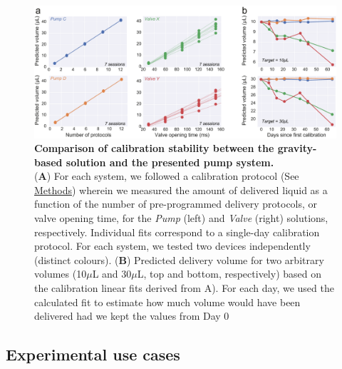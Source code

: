 \begin{figure} 
	\centering
	\includegraphics[width=1.0\linewidth]{Figures/Artboard 2.pdf}
	\caption{\textbf{Comparison of calibration stability between the gravity-based solution and the presented pump system.}\\
		(\textbf{A}) For each system, we followed a calibration protocol (See \hyperref[s:methods]{Methods}) wherein we measured the amount of delivered liquid as a function of the number of pre-programmed delivery protocols, or valve opening time, for the \textit{Pump} (left) and \textit{Valve} (right) solutions, respectively. Individual fits correspond to a single-day calibration protocol. For each system, we tested two devices independently (distinct colours). (\textbf{B}) Predicted delivery volume for two arbitrary volumes (10$\mu$L and 30$\mu$L, top and bottom, respectively) based on the calibration linear fits derived from A). For each day, we used the calculated fit to estimate how much volume would have been delivered had we kept the values from Day 0}
	\label{fig:PumpVsValve} 
\end{figure}


\subsection*{Experimental use cases}



